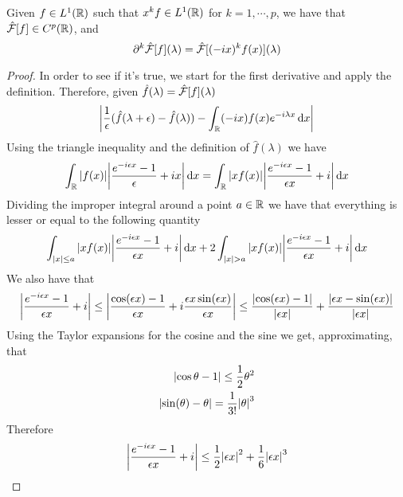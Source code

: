 \documentclass[../complete.tex]{subfiles}
\begin{document}
\begin{thm}
	Given $f\in L^1(\mathbb{R})$ such that $x^kf\in L^1(\mathbb{R})$ for $k=1,\cdots,p$, we have that $\hat{\mathcal{F}}[f]\in C^p(\mathbb{R})$, and
	\begin{equation*}
		\partial^k\hat{\mathcal{F}}[f](\lambda)=\hat{\mathcal{F}}[(-ix)^kf(x)](\lambda)
	\end{equation*}
\end{thm}
\begin{proof}
	In order to see if it's true, we start for the first derivative and apply the definition. Therefore, given $\hat{f}(\lambda)=\hat{\mathcal{F}}[f](\lambda)$
	\begin{equation*}
		\abs{\frac{1}{\epsilon}(\hat{f}(\lambda+\epsilon)-\hat{f}(\lambda))-\int_{\mathbb{R}}^{}(-ix)f(x)e^{-i\lambda x}\operatorname{d\!} x}
	\end{equation*}
	Using the triangle inequality and the definition of $\hat{f}(\lambda)$ we have
	\begin{equation*}
		\int_{\mathbb{R}}^{}\abs{f(x)}\abs{\frac{e^{-i\epsilon x}-1}{\epsilon}+ix}\operatorname{d\!} x=\int_{\mathbb{R}}^{}\abs{xf(x)}\abs{\frac{e^{-i\epsilon x}-1}{\epsilon x}+i}\operatorname{d\!} x
	\end{equation*}
	Dividing the improper integral around a point $a\in\mathbb{R}$ we have that everything is lesser or equal to the following quantity
	\begin{equation*}
		\int_{\abs{x}\le a}^{}\abs{xf(x)}\abs{\frac{e^{-i\epsilon x}-1}{\epsilon x}+i}\operatorname{d\!} x+2\int_{\abs{x}>a}^{}\abs{xf(x)}\abs{\frac{e^{-i\epsilon x}-1}{\epsilon x}+i}\operatorname{d\!} x
	\end{equation*}
	We also have that
	\begin{equation*}
		\abs{\frac{e^{-i\epsilon x}-1}{\epsilon x}+i}\le\abs{\frac{\cos(\epsilon x)-1}{\epsilon x}+i\frac{\epsilon x\sin(\epsilon x)}{\epsilon x}}\le\frac{\abs{\cos(\epsilon x)-1}}{\abs{\epsilon x}}+\frac{\abs{\epsilon x-\sin(\epsilon x)}}{\abs{\epsilon x}}
	\end{equation*}
	Using the Taylor expansions for the cosine and the sine we get, approximating, that
	\begin{equation*}
		\begin{aligned}
			\abs{\cos{\theta}-1}\le\frac{1}{2}\theta^2\\
			\abs{\sin(\theta)-\theta}=\frac{1}{3!}\abs{\theta}^3
		\end{aligned}
	\end{equation*}
	Therefore
	\begin{equation*}
		\abs{\frac{e^{-i\epsilon x}-1}{\epsilon x}+i}\le\frac{1}{2}\abs{\epsilon x}^2+\frac{1}{6}\abs{\epsilon x}^3
	\end{equation*}

\end{proof}
\end{document}

